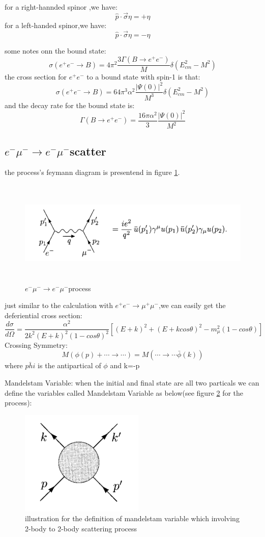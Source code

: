 for a right-hannded spinor ,we have:
\[\hat{p}\cdot\vec{\sigma}\eta=+\eta\]
for a left-handed spinor,we have:
\[\hat{p}\cdot\vec{\sigma}\eta=-\eta\]

some notes onn the bound state:
\[\sigma(e^+e^-\rightarrow B)=4\pi^2\frac{3\Gamma(B\rightarrow e^+e^-)}{M}\delta(E_{cm}^2-M^2)\]
the cross section for $e^+e^-$ to a bound state with spin-1 is that:
\[\sigma(e^+e^-\rightarrow B)=64\pi^3\alpha^2\frac{|\Psi(0)|^2}{M^3}\delta(E_{cm}^2-M^2)\]
and the decay rate  for the bound state is:
\[\Gamma(B\rightarrow e^+e^-)=\frac{16\pi\alpha^2}{3}\frac{|\Psi(0)|^2}{M^2}\]
\subsection{$e^-\mu^-\rightarrow e^-\mu^- $scatter}
the process's feymann diagram is presentend in figure \ref{fig:qedemu}.
\begin{figure}
\begin{center}
\includegraphics[height=5cm]{./figures/QEDemu.PNG}
\caption{$e^-\mu^-\rightarrow e^-\mu^-$process}
\label{fig:qedemu}
\end{center}
\end{figure}
just similar to the calculation with $e^+e^-\rightarrow \mu^+\mu^-$,we can easily get the deferiential cross section:
\[\frac{d\sigma}{d\Omega}=\frac{\alpha^2}{2k^2(E+k)^2(1-cos\theta)^2}[(E+k)^2+(E+kcos\theta)^2-m_{\mu}^2(1-cos\theta)]\]
Crossing Symmetry:
\[M(\phi(p)+\cdots\rightarrow\cdots)=M(\cdots\rightarrow \cdots\bar{\phi}(k))\]
where $\bar{phi}$ is the antipartical of $\phi$ and k=-p\par
Mandelstam Variable:
when the initial and final state are all two particals we can define the variables called Mandelstam Variable as below(see figure \ref{fig:man} for the process):
\begin{figure}
\begin{center}
\includegraphics[height=5cm]{./figures/mandelstam.PNG}
\caption{illustration for the definition of mandelstam variable which involving 2-body to 2-body scattering process}
\label{fig:man}
\end{center}
\end{figure}
